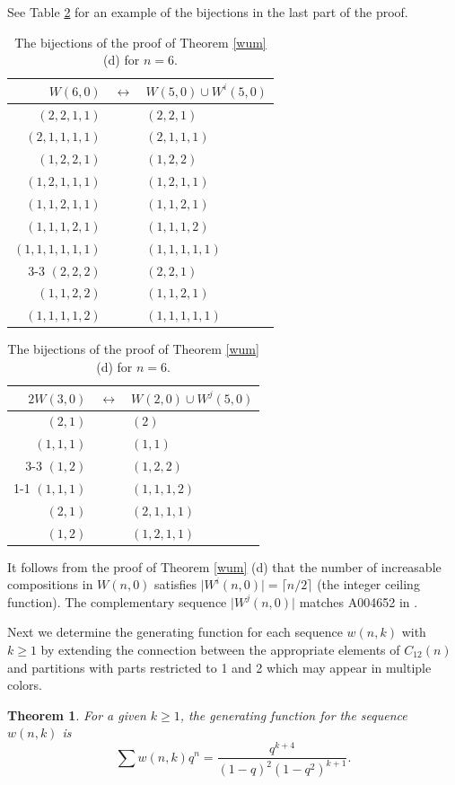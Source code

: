 \documentclass[]{interact}
\theoremstyle{plain}
\numberwithin{equation}{section} %
\newtheorem{theorem}[thm]{Theorem}
\numberwithin{table}{section} %
\numberwithin{figure}{section}
\begin{document}
See Table \ref{wumd} for an example of the bijections in the last part of the proof.

\begin{table}[ht]
\caption{The bijections of the proof of Theorem \ref{wum} (d) for $n= 6$.} 
\medskip
\centering
\begin{tabular}{rcl}
$W(6,0)$ & $\longleftrightarrow$ & $W(5,0) \cup W^i(5,0)$ \\ \hline
$(2,2,1,1)$ & & $(2,2,1)$ \\
$(2,1,1,1,1)$ & & $(2,1,1,1)$ \\
$(1,2,2,1)$ & & $(1,2,2)$ \\
$(1,2,1,1,1)$ & & $(1,2,1,1)$ \\ 
$(1,1,2,1,1)$ & & $(1,1,2,1)$ \\
$(1,1,1,2,1)$ & & $(1,1,1,2)$ \\
$(1,1,1,1,1,1)$ & & $(1,1,1,1,1)$ \\ \cline{3-3}
$(2,2,2)$ & & $(2,2,1)$  \\
$(1,1,2,2)$ & & $(1,1,2,1)$ \\
$(1,1,1,1,2)$ & & $(1,1,1,1,1)$ 
\end{tabular}
\begin{tabular}{rcl}
$2W(3,0)$ & $\longleftrightarrow$ & $W(2,0) \cup W^j(5,0)$ \\ \hline
$(2,1)$ & & $(2)$ \\
$(1,1,1)$ & & $(1,1)$ \\ \cline{3-3}
$(1,2)$ & & $(1,2,2)$ \\ \cline{1-1}
$(1,1,1)$ & & $(1,1,1,2)$ \\
$(2,1)$ & & $(2,1,1,1)$ \\ 
$(1,2)$ & & $(1,2,1,1)$ 
\end{tabular}
\label{wumd}
\end{table}

It follows from the proof of Theorem \ref{wum} (d) that the number of increasable compositions in $W(n,0)$ satisfies $\vert W^i(n,0) \vert = \lceil n/2 \rceil$ (the integer ceiling function).  The complementary sequence $\vert W^j(n,0) \vert$ matches A004652 in \cite{o}.

Next we determine the generating function for each sequence $w(n,k)$ with $k \ge 1$ by extending the connection between the appropriate elements of $C_{12}(n)$ and partitions with parts restricted to 1 and 2 which may appear in multiple colors.

\begin{theorem} \label{wcolgf}
For a given $k \ge 1$, the generating function for the sequence $w(n,k)$ is
\[ \sum w(n,k) q^n = \frac{q^{k+4}}{(1-q)^2(1-q^2)^{k+1}}.\]
\end{theorem}
\end{document}
